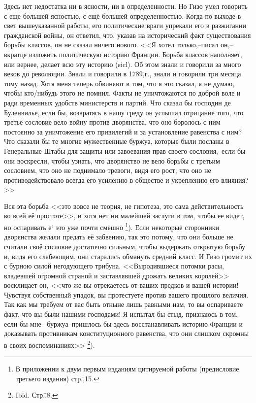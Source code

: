 Здесь нет недостатка ни в ясности, ни в определенности. Но Гизо умел говорить с еще большей ясностью, с ещё большей определенностью. Когда по выходе в свет вышеуказанной работы, его политические враги упрекали его в разжигании гражданской войны, он ответил, что, указав на исторический факт существования борьбы классов, он не сказал ничего нового. <<Я хотел только,\---писал он,\--- вкратце изложить политическую историю Франции. Борьба классов наполняет, или вернее, делает всю эту историю (sicl). Об этом знали и говорили за много веков до революции. Знали и говорили в 1789\=,г., знали и говорили три месяца тому назад. Хотя меня теперь обвиняют в том, что я это сказал, я не думаю, чтобы кто\-/нибудь этого не помнил. Факты не уничтожаются по доброй воле и ради временных удобств министерств и партий. Что сказал бы господин де Буленвилье, если бы, возвратясь в нашу среду он услышал отрицание того, что третье сословие вело войну против дворянства, что оно боролось с ним постоянно за уничтожение его привилегий и за установление равенства с ним? Что сказали бы те многие мужественные буржуа, которые были посланы в Генеральные Штабы для защиты или завоевания прав своего сословия,\---если бы они воскресли, чтобы узнать, что дворянство не вело борьбы с третьим сословием, что оно не поднимало тревоги, видя его рост, что оно не противодействовало всегда его усилению в обществе и укреплению его влияния?>>

Вся эта борьба <<это вовсе не теория, не гипотеза, это сама действительность во всей её простоте>>, и хотя нет ни малейшей заслуги в том, чтобы ее видет, но оспаривать е` это уже почти смешно \footnote{В приложении к двум первым изданиям цитируемой работы (предисловие третьего издания) стр.\=,15.}). Если некоторые сторонники дворянства желали предать её забвению, так это потому, что они больше не считали своё сословие достаточно сильным, чтобы выдержать открытую борьбу и, видя его слабеющим, они старались обмануть средний класс. И Гизо громит их с бурною силой негодующего трибуна. <<Выродившиеся потомки расы, владевшей огромной страной и заставлявшей дрожать великих королей>> восклицает он, <<что же вы отрекаетесь от ваших предков и вашей истории! Чувствуя собственный упадок, вы протестуете против вашего прошлого величия. Так как мы требуем от вас быть отныне лишь равными нам, то вы оспариваете факт, что вы были нашими господами! Я испытал бы стыд, признаюсь в том, если бы мне\--- буржуа\---пришлось бы здесь восстанавливать историю Франции и доказывать противникам конституционного равенства, что они слишком скромны в своих воспоминаниях>> \footnote{Ibid. Стр.\=,8.}).

